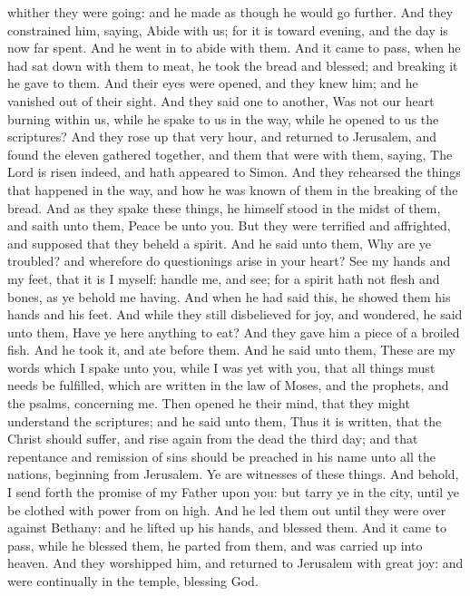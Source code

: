 whither they were going: and he made as though he would go further. And they constrained him, saying, Abide with us; for it is toward evening, and the day is now far spent. And he went in to abide with them. And it came to pass, when he had sat down with them to meat, he took the bread and blessed; and breaking it he gave to them. And their eyes were opened, and they knew him; and he vanished out of their sight. And they said one to another, Was not our heart burning within us, while he spake to us in the way, while he opened to us the scriptures? And they rose up that very hour, and returned to Jerusalem, and found the eleven gathered together, and them that were with them, saying, The Lord is risen indeed, and hath appeared to Simon. And they rehearsed the things that happened in the way, and how he was known of them in the breaking of the bread.  And as they spake these things, he himself stood in the midst of them, and saith unto them, Peace be unto you. But they were terrified and affrighted, and supposed that they beheld a spirit. And he said unto them, Why are ye troubled? and wherefore do questionings arise in your heart? See my hands and my feet, that it is I myself: handle me, and see; for a spirit hath not flesh and bones, as ye behold me having. And when he had said this, he showed them his hands and his feet. And while they still disbelieved for joy, and wondered, he said unto them, Have ye here anything to eat? And they gave him a piece of a broiled fish. And he took it, and ate before them.  And he said unto them, These are my words which I spake unto you, while I was yet with you, that all things must needs be fulfilled, which are written in the law of Moses, and the prophets, and the psalms, concerning me. Then opened he their mind, that they might understand the scriptures; and he said unto them, Thus it is written, that the Christ should suffer, and rise again from the dead the third day; and that repentance and remission of sins should be preached in his name unto all the nations, beginning from Jerusalem. Ye are witnesses of these things. And behold, I send forth the promise of my Father upon you: but tarry ye in the city, until ye be clothed with power from on high.  And he led them out until they were over against Bethany: and he lifted up his hands, and blessed them. And it came to pass, while he blessed them, he parted from them, and was carried up into heaven. And they worshipped him, and returned to Jerusalem with great joy: and were continually in the temple, blessing God. 